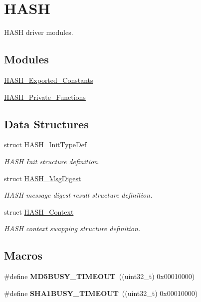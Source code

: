 \hypertarget{group___h_a_s_h}{\section{H\-A\-S\-H}
\label{group___h_a_s_h}
}


H\-A\-S\-H driver modules.  


\subsection*{Modules}
\begin{DoxyCompactItemize}
\item 
\hyperlink{group___h_a_s_h___exported___constants}{H\-A\-S\-H\-\_\-\-Exported\-\_\-\-Constants}
\item 
\hyperlink{group___h_a_s_h___private___functions}{H\-A\-S\-H\-\_\-\-Private\-\_\-\-Functions}
\end{DoxyCompactItemize}
\subsection*{Data Structures}
\begin{DoxyCompactItemize}
\item 
struct \hyperlink{struct_h_a_s_h___init_type_def}{H\-A\-S\-H\-\_\-\-Init\-Type\-Def}
\begin{DoxyCompactList}\small\item\em H\-A\-S\-H Init structure definition. \end{DoxyCompactList}\item 
struct \hyperlink{struct_h_a_s_h___msg_digest}{H\-A\-S\-H\-\_\-\-Msg\-Digest}
\begin{DoxyCompactList}\small\item\em H\-A\-S\-H message digest result structure definition. \end{DoxyCompactList}\item 
struct \hyperlink{struct_h_a_s_h___context}{H\-A\-S\-H\-\_\-\-Context}
\begin{DoxyCompactList}\small\item\em H\-A\-S\-H context swapping structure definition. \end{DoxyCompactList}\end{DoxyCompactItemize}
\subsection*{Macros}
\begin{DoxyCompactItemize}
\item 
\hypertarget{group___h_a_s_h_ga2e8709ff53a6e39167b9509d056bc14c}{\#define {\bfseries M\-D5\-B\-U\-S\-Y\-\_\-\-T\-I\-M\-E\-O\-U\-T}~((uint32\-\_\-t) 0x00010000)}\label{group___h_a_s_h_ga2e8709ff53a6e39167b9509d056bc14c}

\item 
\hypertarget{group___h_a_s_h_gaa15d9e8e64ae5a78035edb854014c012}{\#define {\bfseries S\-H\-A1\-B\-U\-S\-Y\-\_\-\-T\-I\-M\-E\-O\-U\-T}~((uint32\-\_\-t) 0x00010000)}\label{group___h_a_s_h_gaa15d9e8e64ae5a78035edb854014c012}

\end{DoxyCompactItemize}
